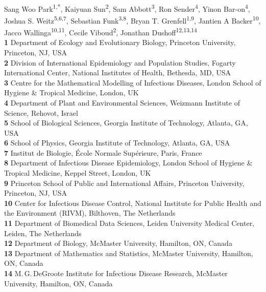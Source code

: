 \documentclass[12pt]{article}
\date{\today}
\begin{document}
\begin{flushleft}{
	\Large
	\textbf{}
}
\newline
\\
Sang Woo Park\textsuperscript{1,*},
Kaiyuan Sun\textsuperscript{2},
Sam Abbott\textsuperscript{3},
Ron Sender\textsuperscript{4},
Yinon Bar-on\textsuperscript{4},
Joshua S. Weitz\textsuperscript{5,6,7},
Sebastian Funk\textsuperscript{3,8}, 
Bryan T. Grenfell\textsuperscript{1,9},
Jantien A Backer\textsuperscript{10},
Jacco Wallinga\textsuperscript{10,11},
Cecile Viboud\textsuperscript{2},
Jonathan Dushoff\textsuperscript{12,13,14}
\\
\bigskip
\textbf{1} Department of Ecology and Evolutionary Biology, Princeton University, Princeton, NJ, USA
\\
\textbf{2} Division of International Epidemiology and Population Studies, Fogarty International Center, National Institutes of Health, Bethesda, MD, USA
\\
\textbf{3} Centre for the Mathematical Modelling of Infectious Diseases, London School of Hygiene \& Tropical Medicine, London, UK
\\
\textbf{4} Department of Plant and Environmental Sciences, Weizmann Institute of Science, Rehovot, Israel
\\
\textbf{5} School of Biological Sciences, Georgia Institute of Technology, Atlanta, GA, USA
\\
\textbf{6} School of Physics, Georgia Institute of Technology, Atlanta, GA, USA
\\
\textbf{7} Institut de Biologie, \'{E}cole Normale Sup\'{e}rieure, Paris, France
\\
\textbf{8} Department of Infectious Disease Epidemiology, London School of Hygiene \& Tropical Medicine, Keppel Street, London, UK
\\
\textbf{9} Princeton School of Public and International Affairs, Princeton University, Princeton, NJ, USA
\\
\textbf{10} Center for Infectious Disease Control, National Institute for Public Health and the Environment (RIVM), Bilthoven, The Netherlands
\\
\textbf{11} Department of Biomedical Data Sciences, Leiden University Medical Center, Leiden, The Netherlands
\\
\textbf{12} Department of Biology, McMaster University, Hamilton, ON, Canada
\\
\textbf{13} Department of Mathematics and Statistics, McMaster University, Hamilton, ON, Canada
\\
\textbf{14} M.\,G.\,DeGroote Institute for Infectious Disease Research, McMaster University, Hamilton, ON, Canada
\\
\bigskip


\end{flushleft}
\end{document}
